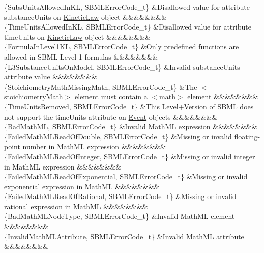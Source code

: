 \begin{DoxyParagraph}{}
\begin{longtabu}
\{Subs\+Units\+Allowed\+In\+KL, S\+B\+M\+L\+Error\+Code\+\_\+t\} &Disallowed value for attribute \textquotesingle{}substance\+Units\textquotesingle{} on \hyperlink{class_kinetic_law}{Kinetic\+Law} object &&&&&&&&\\
\{Time\+Units\+Allowed\+In\+KL, S\+B\+M\+L\+Error\+Code\+\_\+t\} &Disallowed value for attribute \textquotesingle{}time\+Units\textquotesingle{} on \hyperlink{class_kinetic_law}{Kinetic\+Law} object &&&&&&&&\\
\{Formula\+In\+Level1\+KL, S\+B\+M\+L\+Error\+Code\+\_\+t\} &Only predefined functions are allowed in S\+B\+ML Level 1 formulas &&&&&&&&\\
\{L3\+Substance\+Units\+On\+Model, S\+B\+M\+L\+Error\+Code\+\_\+t\} &Invalid \textquotesingle{}substance\+Units\textquotesingle{} attribute value &&&&&&&&\\
\{Stoichiometry\+Math\+Missing\+Math, S\+B\+M\+L\+Error\+Code\+\_\+t\} &The {\ttfamily $<$stoichiometry\+Math$>$} element must contain a {\ttfamily $<$math$>$} element &&&&&&&&\\
\{Time\+Units\+Removed, S\+B\+M\+L\+Error\+Code\+\_\+t\} &This Level+\+Version of S\+B\+ML does not support the \textquotesingle{}time\+Units\textquotesingle{} attribute on \hyperlink{class_event}{Event} objects &&&&&&&&\\
\{Bad\+Math\+ML, S\+B\+M\+L\+Error\+Code\+\_\+t\} &Invalid Math\+ML expression &&&&&&&&\\
\{Failed\+Math\+M\+L\+Read\+Of\+Double, S\+B\+M\+L\+Error\+Code\+\_\+t\} &Missing or invalid floating-\/point number in Math\+ML expression &&&&&&&&\\
\{Failed\+Math\+M\+L\+Read\+Of\+Integer, S\+B\+M\+L\+Error\+Code\+\_\+t\} &Missing or invalid integer in Math\+ML expression &&&&&&&&\\
\{Failed\+Math\+M\+L\+Read\+Of\+Exponential, S\+B\+M\+L\+Error\+Code\+\_\+t\} &Missing or invalid exponential expression in Math\+ML &&&&&&&&\\
\{Failed\+Math\+M\+L\+Read\+Of\+Rational, S\+B\+M\+L\+Error\+Code\+\_\+t\} &Missing or invalid rational expression in Math\+ML &&&&&&&&\\
\{Bad\+Math\+M\+L\+Node\+Type, S\+B\+M\+L\+Error\+Code\+\_\+t\} &Invalid Math\+ML element &&&&&&&&\\
\{Invalid\+Math\+M\+L\+Attribute, S\+B\+M\+L\+Error\+Code\+\_\+t\} &Invalid Math\+ML attribute &&&&&&&&\\

\end{longtabu}
\end{DoxyParagraph}
